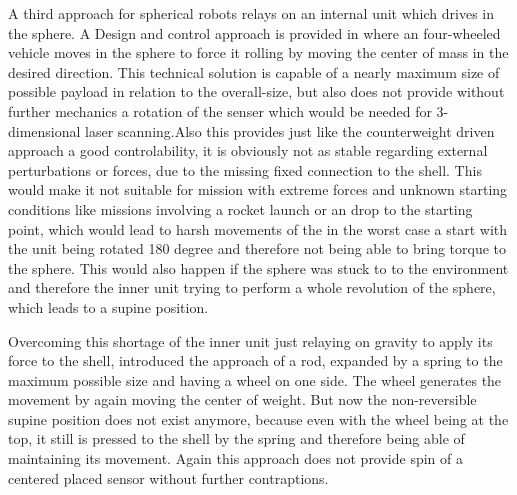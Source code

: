A third approach for spherical robots relays on an internal unit which drives in the sphere. A Design and control approach is provided in \cite{soa6} where an four-wheeled vehicle moves in the sphere to force it rolling by moving the center of mass in the desired direction. This technical solution is capable of a nearly maximum size of possible payload in relation to the overall-size, but also does not  provide without further mechanics a rotation of the senser which would be needed for 3-dimensional laser scanning.Also this provides just like the counterweight driven approach a good controlability, it is obviously not as stable regarding external perturbations or forces, due to the missing fixed connection to the shell. This would make it not suitable for mission with extreme forces and unknown starting conditions like missions involving a rocket launch or an drop to the starting point, which would lead to harsh movements of the in the worst case a start with the unit being rotated 180 degree and therefore not being able to bring torque to the sphere. This would also happen if the sphere was stuck to to the environment and therefore the inner unit trying to perform a whole revolution of the sphere, which leads to a supine position.

Overcoming this shortage of the inner unit just relaying on gravity to apply its force to the shell, \cite{soa7} introduced the approach of a rod, expanded by a spring to the maximum possible size and having a wheel on one side. The wheel generates the movement by again moving the center of weight. But now the non-reversible supine position does not exist anymore, because even with the wheel being at the top, it still is pressed to the shell by the spring and therefore being able of maintaining its movement. Again this approach does not provide spin of a centered  placed sensor without further contraptions.
